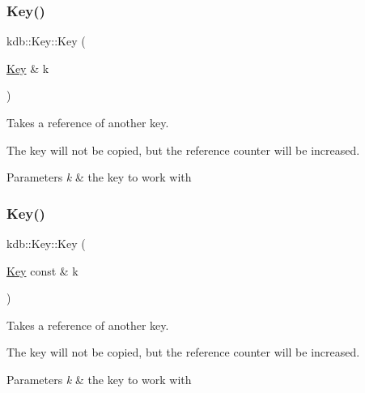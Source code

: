 \subsubsection{\texorpdfstring{Key()}{Key()}\hspace{0.1cm}{\footnotesize\ttfamily [3/7]}}
{\footnotesize\ttfamily kdb\+::\+Key\+::\+Key (\begin{DoxyParamCaption}\item[{\hyperlink{classkdb_1_1Key}{Key} \&}]{k }\end{DoxyParamCaption})\hspace{0.3cm}{\ttfamily [inline]}}



Takes a reference of another key. 

The key will not be copied, but the reference counter will be increased.


\begin{DoxyParams}{Parameters}
{\em k} & the key to work with \\
\hline
\end{DoxyParams}
\mbox{\label{classkdb_1_1Key_ab68da8be743b2f635ff8e28dfaeaaea6}} 
\subsubsection{\texorpdfstring{Key()}{Key()}\hspace{0.1cm}{\footnotesize\ttfamily [4/7]}}
{\footnotesize\ttfamily kdb\+::\+Key\+::\+Key (\begin{DoxyParamCaption}\item[{\hyperlink{classkdb_1_1Key}{Key} const \&}]{k }\end{DoxyParamCaption})\hspace{0.3cm}{\ttfamily [inline]}}



Takes a reference of another key. 

The key will not be copied, but the reference counter will be increased.


\begin{DoxyParams}{Parameters}
{\em k} & the key to work with \\
\hline
\end{DoxyParams}
\mbox{\label{classkdb_1_1Key_a15b2e9e1cc323cde05b0d1d3805656e0}} 
